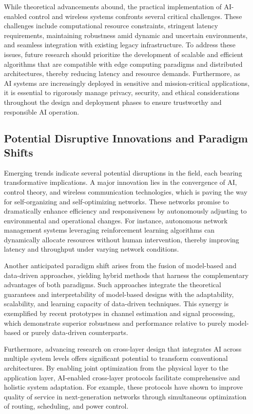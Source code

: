 \documentclass[sigconf]{acmart}
\begin{document}
While theoretical advancements abound, the practical implementation of AI-enabled control and wireless systems confronts several critical challenges. These challenges include computational resource constraints, stringent latency requirements, maintaining robustness amid dynamic and uncertain environments, and seamless integration with existing legacy infrastructure. To address these issues, future research should prioritize the development of scalable and efficient algorithms that are compatible with edge computing paradigms and distributed architectures, thereby reducing latency and resource demands. Furthermore, as AI systems are increasingly deployed in sensitive and mission-critical applications, it is essential to rigorously manage privacy, security, and ethical considerations throughout the design and deployment phases to ensure trustworthy and responsible AI operation.

\subsection{Potential Disruptive Innovations and Paradigm Shifts}

Emerging trends indicate several potential disruptions in the field, each bearing transformative implications. A major innovation lies in the convergence of AI, control theory, and wireless communication technologies, which is paving the way for self-organizing and self-optimizing networks. These networks promise to dramatically enhance efficiency and responsiveness by autonomously adjusting to environmental and operational changes. For instance, autonomous network management systems leveraging reinforcement learning algorithms can dynamically allocate resources without human intervention, thereby improving latency and throughput under varying network conditions.

Another anticipated paradigm shift arises from the fusion of model-based and data-driven approaches, yielding hybrid methods that harness the complementary advantages of both paradigms. Such approaches integrate the theoretical guarantees and interpretability of model-based designs with the adaptability, scalability, and learning capacity of data-driven techniques. This synergy is exemplified by recent prototypes in channel estimation and signal processing, which demonstrate superior robustness and performance relative to purely model-based or purely data-driven counterparts.

Furthermore, advancing research on cross-layer design that integrates AI across multiple system levels offers significant potential to transform conventional architectures. By enabling joint optimization from the physical layer to the application layer, AI-enabled cross-layer protocols facilitate comprehensive and holistic system adaptation. For example, these protocols have shown to improve quality of service in next-generation networks through simultaneous optimization of routing, scheduling, and power control.
\end{document}
